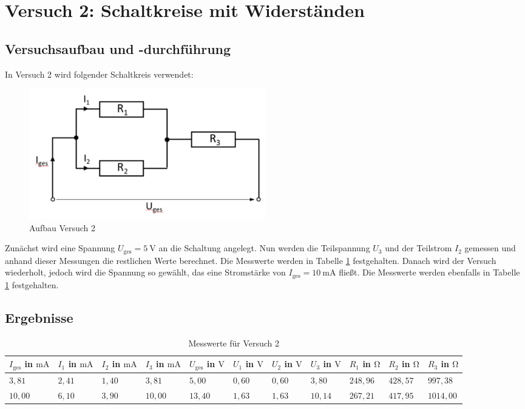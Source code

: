 \section{Versuch 2: Schaltkreise mit Widerständen}

    \subsection{Versuchsaufbau und -durchführung}

        In Versuch 2 wird folgender Schaltkreis verwendet:

        \begin{figure}[H]
            \centering
            \includegraphics[width=0.5\textwidth]{bilder/Physik_04.png}
            \caption{Aufbau Versuch 2}
            \label{fig:versuch2}
        \end{figure}
           
        Zunächst wird eine Spannung $U_{\mathrm{ges}} = 5\ \mathrm{V}$ an die Schaltung angelegt. Nun werden die Teilspannung $U_{3}$ und der Teilstrom $I_{2}$ gemessen und anhand dieser Messungen die restlichen Werte berechnet. Die Messwerte werden in Tabelle \ref{tab:versuch2} festgehalten.
        Danach wird der Versuch wiederholt, jedoch wird die Spannung so gewählt, das eine Stromstärke von $I_{\mathrm{ges}} = 10\ \mathrm{mA}$ fließt. Die Messwerte werden ebenfalls in Tabelle \ref{tab:versuch2} festgehalten.

    \subsection{Ergebnisse}

        \begin{table}[H]
            \centering
            \caption{Messwerte für Versuch 2}
            \begin{tabular}{|l|l|l|l|l|l|l|l|l|l|l|}
                \hline
                $I_{\mathrm{ges}}$ in $\mathrm{mA}$ & $I_{1}$ in $\mathrm{mA}$ & $I_{2}$ in $\mathrm{mA}$ & $I_{3}$ in $\mathrm{mA}$ & $U_{\mathrm{ges}}$ in $\mathrm{V}$ & $U_{1}$ in $\mathrm{V}$ & $U_{2}$ in $\mathrm{V}$ & $U_{3}$ in $\mathrm{V}$ & $R_{1}$ in $\mathrm{\Omega}$ & $R_{2}$ in $\mathrm{\Omega}$ & $R_{3}$ in $\mathrm{\Omega}$\\
                \hline\hline
                $3,81$ & $2,41$ & $1,40$ & $3,81$ & $5,00$ & $0,60$ & $0,60$ & $3,80$ & $248,96$ & $428,57$ & $997,38$\\
                \hline
                $10,00$ & $6,10$ & $3,90$ & $10,00$ & $13,40$ & $1,63$ & $1,63$ & $10,14$ & $267,21$ & $417,95$ & $1014,00$\\
                \hline
            \end{tabular}
            \label{tab:versuch2}
        \end{table}

